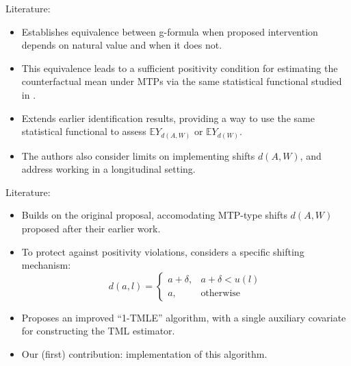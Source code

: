 \documentclass{beamer}
\newcommand{\E}{\mathbb{E}}
\begin{document}

\begin{frame}[c]{Literature: \cite{young2014identification}}

\begin{center}
\begin{itemize}
  \itemsep10pt
  \item Establishes equivalence between g-formula when proposed intervention
    depends on natural value and when it does not.
  \item This equivalence leads to a sufficient positivity condition for
    estimating the counterfactual mean under MTPs via the same statistical
    functional studied in \cite{diaz2012population}.
  \item Extends earlier identification results, providing a way to use the same
    statistical functional to assess $\E Y_{d(A,W)}$ or $\E Y_{d(W)}$.
  \item The authors also consider limits on implementing shifts $d(A,W)$, and
    address working in a longitudinal setting.
\end{itemize}
\end{center}

\note{
}

\end{frame}


\begin{frame}[c]{Literature: \cite{diaz2018stochastic}}

\begin{center}
\begin{itemize}
  \itemsep10pt
  \item Builds on the original proposal, accomodating MTP-type shifts $d(A,W)$
    proposed after their earlier work.
  \item To protect against positivity violations, considers a specific shifting
    mechanism:
     \begin{equation*}\label{shift_intervention}
       d(a, l) =
         \begin{cases}
           a + \delta, & a + \delta < u(l) \\
           a, & \text{otherwise}
         \end{cases}
     \end{equation*}
  \item Proposes an improved ``1-TMLE'' algorithm, with a single auxiliary
    covariate for constructing the TML estimator.
  \item Our (first) contribution: implementation of this algorithm.
\end{itemize}
\end{center}

\note{
}

\end{frame}
\end{document}
